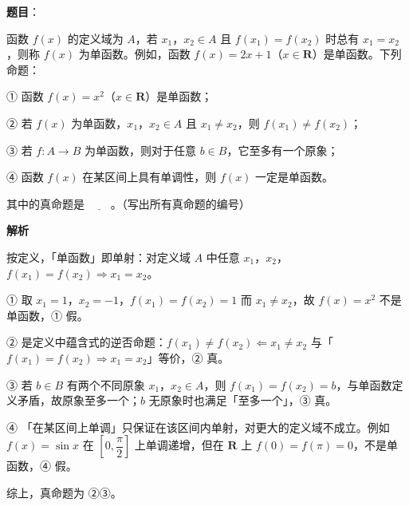 \begin{answer}

\textbf{题目}：

函数 $f(x)$ 的定义域为 $A$，若 $x_1$，$x_2\in A$ 且 $f(x_1)=f(x_2)$ 时总有 $x_1=x_2$，则称 $f(x)$ 为单函数。例如，函数 $f(x)=2x+1$（$x\in\mathbf R$）是单函数。下列命题：

① 函数 $f(x)=x^2$（$x\in\mathbf R$）是单函数；

② 若 $f(x)$ 为单函数，$x_1$，$x_2\in A$ 且 $x_1\neq x_2$，则 $f(x_1)\neq f(x_2)$；

③ 若 $f\colon A\to B$ 为单函数，则对于任意 $b\in B$，它至多有一个原象；

④ 函数 $f(x)$ 在某区间上具有单调性，则 $f(x)$ 一定是单函数。

其中的真命题是 $\underline{\qquad}$。（写出所有真命题的编号）

\textbf{解析}

按定义，「单函数」即单射：对定义域 $A$ 中任意 $x_1$，$x_2$，$f(x_1)=f(x_2)\Rightarrow x_1=x_2$。

① 取 $x_1=1$，$x_2=-1$，$f(x_1)=f(x_2)=1$ 而 $x_1\neq x_2$，故 $f(x)=x^2$ 不是单函数，① 假。

② 是定义中蕴含式的逆否命题：$f(x_1)\neq f(x_2)\Leftarrow x_1\neq x_2$ 与「$f(x_1)=f(x_2)\Rightarrow x_1=x_2$」等价，② 真。

③ 若 $b\in B$ 有两个不同原象 $x_1$，$x_2\in A$，则 $f(x_1)=f(x_2)=b$，与单函数定义矛盾，故原象至多一个；$b$ 无原象时也满足「至多一个」，③ 真。

④ 「在某区间上单调」只保证在该区间内单射，对更大的定义域不成立。例如 $f(x)=\sin x$ 在 $\left[0,\dfrac{\pi}{2}\right]$ 上单调递增，但在 $\mathbf R$ 上 $f(0)=f(\pi)=0$，不是单函数，④ 假。

综上，真命题为 ②③。


\end{answer}
